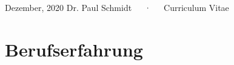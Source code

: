 \documentclass[11pt, a4paper]{awesome-cv}
\begin{document}
\makecvheader

\makecvfooter
  {Dezember, 2020}
    {Dr. Paul Schmidt~~~·~~~Curriculum Vitae}
  {\thepage}






\hypertarget{berufserfahrung}{%
\section{Berufserfahrung}\label{berufserfahrung}}
\end{document}
